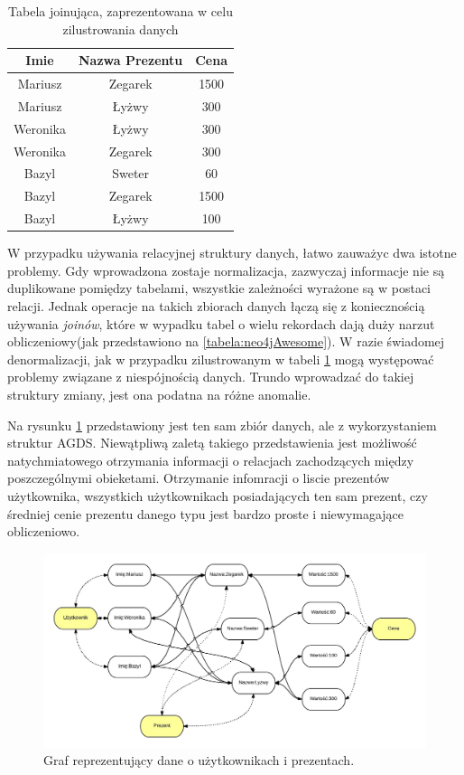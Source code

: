 \begin{table}
\label{tabela:join}
    \centering
    \caption{Tabela joinująca, zaprezentowana w celu zilustrowania danych}
    \begin{tabular}{| c | c | c |}
        \hline
        Imie & Nazwa Prezentu & Cena \\
        \hline
        Mariusz & Zegarek & 1500 \\
        \hline
        Mariusz & Łyżwy & 300 \\
        \hline
        Weronika & Łyżwy & 300 \\
        \hline
        Weronika & Zegarek & 300 \\
        \hline
        Bazyl & Sweter & 60 \\
        \hline
        Bazyl & Zegarek & 1500 \\
        \hline
        Bazyl & Łyżwy & 100 \\
        \hline
    \end{tabular}

\end{table}

W przypadku używania relacyjnej struktury danych, łatwo zauważyc dwa istotne problemy. Gdy wprowadzona zostaje normalizacja, zazwyczaj informacje nie są duplikowane pomiędzy
tabelami, wszystkie zależności wyrażone są w postaci relacji. Jednak operacje na takich zbiorach danych łączą się z koniecznością używania \emph{joinów}, które w wypadku
tabel o wielu rekordach dają duży narzut obliczeniowy(jak przedstawiono na \ref{tabela:neo4jAwesome}). W razie świadomej denormalizacji, jak w przypadku zilustrowanym w tabeli
\ref{tabela:join} mogą występować problemy związane z niespójnością danych. Trundo wprowadzać do takiej struktury zmiany, jest ona podatna na różne anomalie.

Na rysunku \ref{graph:agds} przedstawiony jest ten sam zbiór danych, ale z wykorzystaniem struktur AGDS. Niewątpliwą zaletą takiego przedstawienia jest możliwość natychmiatowego
otrzymania informacji o relacjach zachodzących między poszczególnymi obieketami. Otrzymanie infomracji o liscie prezentów użytkownika, wszystkich użytkownikach posiadających
ten sam prezent, czy średniej cenie prezentu danego typu jest bardzo proste i niewymagające obliczeniowo.

\begin{figure}[!h]
    \label{graph:agds}
    \includegraphics[width=\textwidth]{agds}
    \caption{Graf reprezentujący dane o użytkownikach i prezentach.}
\end{figure}

